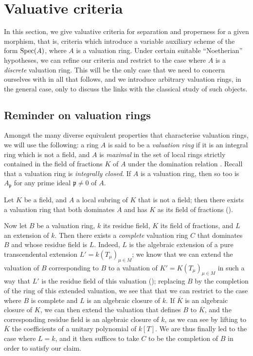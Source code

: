 \section{Valuative criteria}
\label{section:II.7}

In this section, we give valuative criteria for separation and properness for a given morphism, that is, criteria which introduce a variable auxiliary scheme of the form $\operatorname{Spec}(A)$, where $A$ is a valuation ring.
Under certain suitable ``Noetherian'' hypotheses, we can refine our criteria and restrict to the case where $A$ is a \emph{discrete} valuation ring.
This will be the only case that we need to concern ourselves with in all that follows, and we introduce arbitrary valuation rings, in the general case, only to discuss the links with the classical study of such objects.


\subsection{Reminder on valuation rings}
\label{subsection:II.7.1}

\begin{env}[7.1.1]
\label{II.7.1.1}
Amongst the many diverse equivalent properties that characterise valuation rings, we will use the following: a ring $A$ is said to be a \emph{valuation ring} if it is an integral ring which is not a field, and $A$ is \emph{maximal} in the set of local rings strictly contained in the field of fractions $K$ of $A$ under the domination relation .
Recall that a valuation ring is \emph{integrally closed}.
If $A$ is a valuation ring, then so too is $A_\mathfrak{p}$ for any prime ideal $\mathfrak{p}\neq0$ of $A$.
\end{env}

\begin{env}[7.1.2]
\label{II.7.1.2}
Let $K$ be a field, and $A$ a local subring of $K$ that is not a field;
then there exists a valuation ring that both dominates $A$ and has $K$ as its field of fractions (\cite[p.~1-07, lemma~2]{I-1}).

Now let $B$ be a valuation ring, $k$ its residue field, $K$ its field of fractions, and $L$ an extension of $k$.
Then there exists a \emph{complete} valuation ring $C$ that dominates $B$ and whose residue field is $L$.
Indeed, $L$ is the algebraic extension of a pure transcendental extension $L'=k(T_\mu)_{\mu\in M}$;
we know that we can extend the valuation of $B$ corresponding to $B$ to a valuation of $K'=K(T_\mu)_{\mu\in M}$ in such a way that $L'$ is the residue field of this valuation (\cite[p.~98]{II-24});
replacing $B$ by the completion of the ring of this extended valuation, we see that that we can restrict to the case where $B$ is complete and $L$ is an algebraic closure of $k$.
If $\overline{K}$ is an algebraic closure of $K$, we can then extend the valuation that defines $B$ to $\overline{K}$, and the corresponding residue field is an algebraic closure of $k$, as we can see by lifting to $\overline{K}$ the coefficients of a unitary polynomial of $k[T]$.
We are thus finally led to the case where $L=k$, and it then suffices to take $C$ to be the completion of $B$ in order to satisfy our claim.
\end{env}

